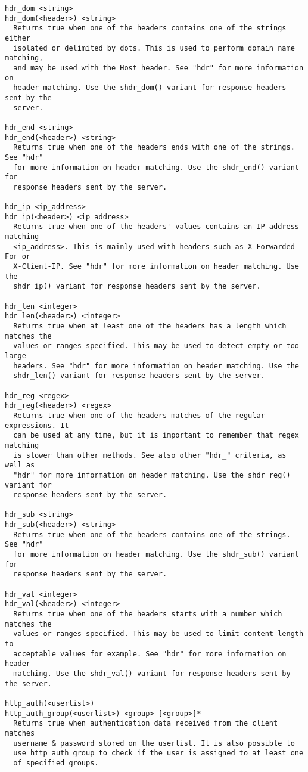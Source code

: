 \begin{verbatim}
hdr_dom <string>
hdr_dom(<header>) <string>
  Returns true when one of the headers contains one of the strings either
  isolated or delimited by dots. This is used to perform domain name matching,
  and may be used with the Host header. See "hdr" for more information on
  header matching. Use the shdr_dom() variant for response headers sent by the
  server.

hdr_end <string>
hdr_end(<header>) <string>
  Returns true when one of the headers ends with one of the strings. See "hdr"
  for more information on header matching. Use the shdr_end() variant for
  response headers sent by the server.

hdr_ip <ip_address>
hdr_ip(<header>) <ip_address>
  Returns true when one of the headers' values contains an IP address matching
  <ip_address>. This is mainly used with headers such as X-Forwarded-For or
  X-Client-IP. See "hdr" for more information on header matching. Use the
  shdr_ip() variant for response headers sent by the server.

hdr_len <integer>
hdr_len(<header>) <integer>
  Returns true when at least one of the headers has a length which matches the
  values or ranges specified. This may be used to detect empty or too large
  headers. See "hdr" for more information on header matching. Use the
  shdr_len() variant for response headers sent by the server.

hdr_reg <regex>
hdr_reg(<header>) <regex>
  Returns true when one of the headers matches of the regular expressions. It
  can be used at any time, but it is important to remember that regex matching
  is slower than other methods. See also other "hdr_" criteria, as well as
  "hdr" for more information on header matching. Use the shdr_reg() variant for
  response headers sent by the server.

hdr_sub <string>
hdr_sub(<header>) <string>
  Returns true when one of the headers contains one of the strings. See "hdr"
  for more information on header matching. Use the shdr_sub() variant for
  response headers sent by the server.

hdr_val <integer>
hdr_val(<header>) <integer>
  Returns true when one of the headers starts with a number which matches the
  values or ranges specified. This may be used to limit content-length to
  acceptable values for example. See "hdr" for more information on header
  matching. Use the shdr_val() variant for response headers sent by the server.

http_auth(<userlist>)
http_auth_group(<userlist>) <group> [<group>]*
  Returns true when authentication data received from the client matches
  username & password stored on the userlist. It is also possible to
  use http_auth_group to check if the user is assigned to at least one
  of specified groups.


\end{verbatim}
